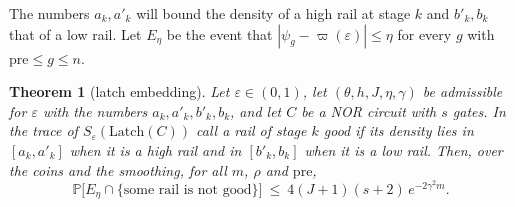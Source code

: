 \documentclass[11pt]{amsart}
\newtheorem{theorem}{Theorem}
\theoremstyle{definition}
\theoremstyle{remark}
\newcommand{\eps}{\varepsilon}
\newcommand{\PP}{\mathbb{P}}
\begin{document}
\noindent The numbers $a_k,a'_k$ will bound the density of a high rail at stage $k$ and
$b'_k,b_k$ that of a low rail. Let $E_\eta$ be the event that $|\psi_g-\varpi(\eps)|\le\eta$ for
every $g$ with $\mathrm{pre}\le g\le n$.

\begin{theorem}[latch embedding]\label{thm:latch}
Let $\eps\in(0,1)$, let $(\theta,h,J,\eta,\gamma)$ be admissible for $\eps$ with the numbers
$a_k,a'_k,b'_k,b_k$, and let $C$ be a NOR circuit with $s$ gates. In the trace of
$S_\eps(\mathrm{Latch}(C))$ call a rail of stage $k$ \emph{good} if its density lies in
$[a_k,a'_k]$ when it is a high rail and in $[b'_k,b_k]$ when it is a low rail. Then, over the
coins and the smoothing, for all $m$, $\rho$ and $\mathrm{pre}$,
\[
\PP\bigl[E_\eta\cap\{\text{some rail is not good}\}\bigr]\ \le\ 4(J+1)(s+2)\,e^{-2\gamma^2m}.
\]
\end{theorem}
\end{document}
